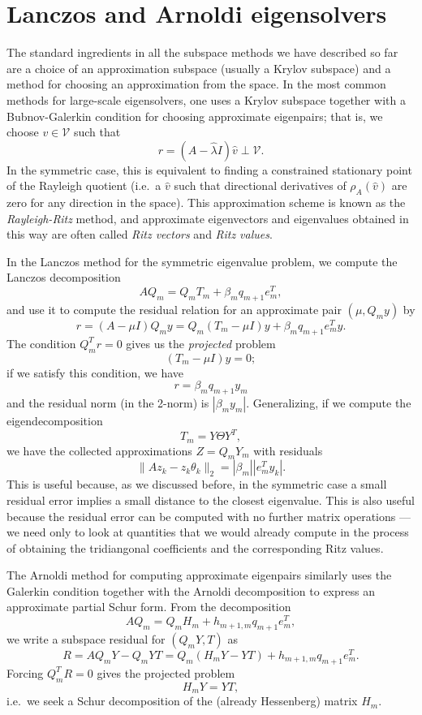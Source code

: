 \section{Lanczos and Arnoldi eigensolvers}

The standard ingredients in all the subspace methods we have
described so far are a choice of an approximation subspace
(usually a Krylov subspace) and a method for choosing an approximation
from the space.  In the most common methods for large-scale eigensolvers,
one uses a Krylov subspace together with a Bubnov-Galerkin condition
for choosing approximate eigenpairs; that is, we choose $v \in \mathcal{V}$
such that
\[
  r = (A-\hat{\lambda} I) \hat{v} \perp \mathcal{V}.
\]
In the symmetric case, this is equivalent to finding a constrained
stationary point of the Rayleigh quotient (i.e.~a $\hat{v}$ such that
directional derivatives of $\rho_A(\hat{v})$ are zero for any direction
in the space).  This approximation scheme is known as the {\em
Rayleigh-Ritz} method, and approximate eigenvectors and eigenvalues
obtained in this way are often called {\em Ritz vectors} and {\em Ritz
values}.

In the Lanczos method for the symmetric eigenvalue problem,
we compute the Lanczos decomposition
\[
  AQ_m = Q_m T_m + \beta_m q_{m+1} e_m^T,
\]
and use it to compute the residual relation for an approximate pair
$(\mu, Q_m y)$ by
\[
  r = (A-\mu I) Q_m y = Q_m (T_m-\mu I) y + \beta_m q_{m+1} e_m^T y.
\]
The condition $Q_m^T r = 0$ gives us the {\em projected} problem
\[
  (T_m-\mu I) y = 0;
\]
if we satisfy this condition, we have
\[
  r = \beta_m q_{m+1} y_m
\]
and the residual norm (in the 2-norm) is $|\beta_m y_m|$.  Generalizing,
if we compute the eigendecomposition
\[
  T_m = Y \Theta Y^T,
\]
we have the collected approximations $Z = Q_m Y_m$ with residuals
\[
  \|Az_k-z_k \theta_k\|_2 = |\beta_m| |e_m^T y_k|.
\]
This is useful because, as we discussed before, in the symmetric case
a small residual error implies a small distance to the closest eigenvalue.
This is also useful because the residual error can be computed with no
further matrix operations --- we need only to look at quantities that
we would already compute in the process of obtaining the tridiangonal
coefficients and the corresponding Ritz values.

The Arnoldi method for computing approximate eigenpairs similarly uses
the Galerkin condition together with the Arnoldi decomposition to
express an approximate partial Schur form.  From the decomposition
\[
  AQ_m = Q_m H_m + h_{m+1,m} q_{m+1} e_m^T,
\]
we write a subspace residual for $(Q_m Y, T)$ as
\[
  R = AQ_m Y - Q_m Y T = Q_m (H_m Y - Y T) + h_{m+1,m} q_{m+1} e_m^T.
\]
Forcing $Q_m^T R = 0$ gives the projected problem
\[
  H_m Y = Y T,
\]
i.e.~we seek a Schur decomposition of the (already Hessenberg)
matrix $H_m$.

